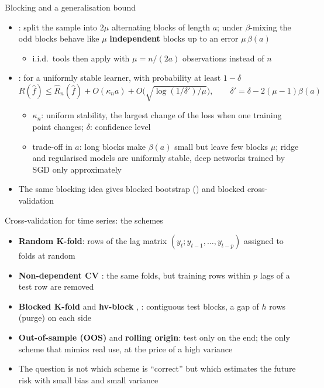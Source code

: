 \begin{frame}{Blocking and a generalisation bound}
\itemsize{\small}
\begin{itemize}
    \item {}: split the sample into $2\mu$ alternating blocks of length $a$; under $\beta$-mixing the odd blocks behave like $\mu$ \textbf{independent} blocks up to an error $\mu\,\beta(a)$
    \begin{itemize}
        \item i.i.d.\ tools then apply with $\mu = n/(2a)$ observations instead of $n$
    \end{itemize}
    \item {}: for a uniformly stable learner, with probability at least $1 - \delta$
    \[ R(\hat f) \le \hat R_n(\hat f) + O(\kappa_n a) + O\Big(\sqrt{\log(1/\delta')/\mu}\Big), \qquad \delta' = \delta - 2(\mu - 1)\beta(a) \]
    \begin{itemize}
        \item $\kappa_n$: uniform stability, the largest change of the loss when one training point changes; $\delta$: confidence level
        \item trade-off in $a$: long blocks make $\beta(a)$ small but leave few blocks $\mu$; ridge and regularised models are uniformly stable, deep networks trained by SGD only approximately
    \end{itemize}
    \item The same blocking idea gives blocked bootstrap () and blocked cross-validation
\end{itemize}
\end{frame}

\begin{frame}{Cross-validation for time series: the schemes}
\itemsize{\small}
\begin{itemize}
    \item \textbf{Random K-fold}: rows of the lag matrix $(y_t; y_{t-1},\dots,y_{t-p})$ assigned to folds at random
    \item \textbf{Non-dependent CV} : the same folds, but training rows within $p$ lags of a test row are removed
    \item \textbf{Blocked K-fold} and \textbf{hv-block} , : contiguous test blocks, a gap of $h$ rows (purge) on each side
    \item \textbf{Out-of-sample (OOS)} and \textbf{rolling origin}: test only on the end; the only scheme that mimics real use, at the price of a high variance
    \item The question is not which scheme is ``correct'' but which estimates the future risk with small bias and small variance
\end{itemize}
\end{frame}

